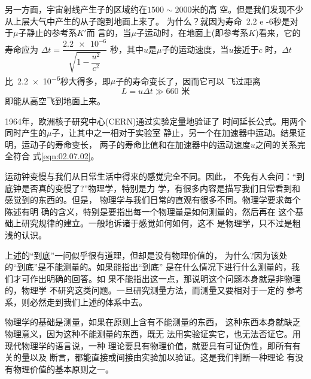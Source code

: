 另一方面，宇宙射线产生子的区域约在$1500\sim2000$米的高
空。但是我们发现不少从上层大气中产生的从子跑到地面上来了。
为什么？就因为寿命~\num{2.2 e -6}秒是对于$\mu$子静止的参考系$K'$而
言的，当$\mu$子运动时，在地面上(即参考系$K$)看来，它的寿命应为
$\Delta t = \dfrac { \num{2.2e-6}}{ \sqrt { 1 - \dfrac { u ^ 2 } { c ^ { 2 } } } }$
秒，其中$u$是$\mu$子的运动速度，当$u$接近于$c$
时，$\Delta t$比~\num{2.2e-6}秒大得多，即$\mu$子的寿命变长了，因而它可以
飞过距离
\begin{equation*}
  L = u \Delta t \gg 660 \text{ 米}
\end{equation*}
即能从高空飞到地面上来。

1964年，欧洲核子研究中心(CERN)通过实验定量地验证了
时间延长公式。用两个同时产生的$\mu$子，让其中之一相对于实验室
静止，另一个在加速器中运动。结果证明，运动子的寿命变长，
两子的寿命比值和在加速器中的运动速度$u$之间的关系完全符合
式\eqref{eqn:02.07.02}。

运动钟变慢与我们从日常生活中得来的感觉完全不同。因此，
不免有人会问：“到底钟是否真的变慢了?”物理学，特别是力
学，有很多内容是描写我们日常看到和感觉到的东西的。但是，
物理学与我们日常的直观有很多不同。物理学要求每个陈述有明
确的含义，特别是要指出每一个物理量是如何测量的，然后再在
这个基础上研究规律的建立。一般地诉诸于感觉如何如何，这不
是物理学，只不过是粗浅的认识。

\clearpage
上述的“到底”一问似乎很有道理，但却是没有物理价值的，
为什么?因为该处的“到底”是不能测量的。如果能指出“到底”
是在什么情况下进行什么测量的，我们才可作出明确的回答。如
果不能指出这一点，那说明这个问题本身就是非物理的，物理学
不研究这类问题。一旦研究测量方法，而测量又要相对于一定的
参考系，则必然走到我们上述的体系中去。

物理学的基础是测量，如果在原则上含有不能测量的东西，
这种东西本身就缺乏物理意义，因为这种不能测量的东西，既无
法用实验证实它，也无法否证它。用现代物理学的语言说，一种
理论要具有物理价值，就要具有可证伪性，即所有有关的量以及
断言，都能直接或间接由实验加以验证。这是我们判断一种理论
有没有物理价值的基本原则之一。
